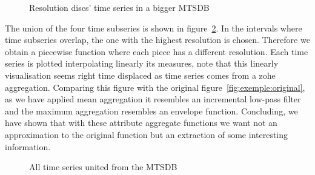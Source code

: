 \begin{figure}[tp]
  \centering
  
  \caption{Resolution discs' time series in a bigger MTSDB}
  \label{fig:exemple:4mrdbigger}
\end{figure}




The union of the four time subseries is shown in
figure~\ref{fig:exemple:4mrdtot}.  In the intervals where time
subseries overlap, the one with the highest resolution is
chosen. Therefore we obtain a piecewise function where each piece has
a different resolution.  Each time series is plotted interpolating
linearly its measures, note that this linearly visualisation seems
right time displaced as time series comes from a zohe aggregation.
Comparing this figure with the original
figure~\ref{fig:exemple:original}, as we have applied mean aggregation
it resembles an incremental low-pass filter and the maximum
aggregation resembles an envelope function. Concluding, we have shown
that with these attribute aggregate functions we want not an
approximation to the original function but an extraction of some
interesting information.




\begin{figure}[tp]
  \centering
  
  \caption{All time series united from the MTSDB}
  \label{fig:exemple:4mrdtot}
\end{figure}




